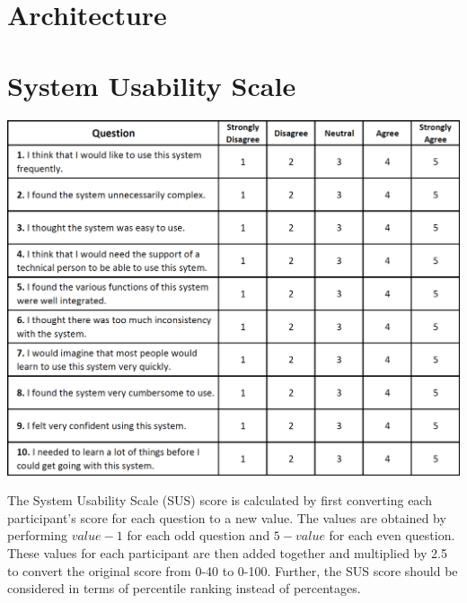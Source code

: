 
\appendix
\chapter{Architecture} {
\label{app:architecture}
	
}

\chapter{System Usability Scale} {
\label{app:system_usability_scale}

	\includegraphics[width=\textwidth]{images/design/sus}

	The System Usability Scale (SUS) score is calculated by first converting each participant's score for each question to a new value. The values are obtained by performing $value - 1$ for each odd question and $5 - value$ for each even question. These values for each participant are then added together and multiplied by 2.5 to convert the original score from 0-40 to 0-100. Further, the SUS score should be considered in terms of percentile ranking instead of percentages.




}

